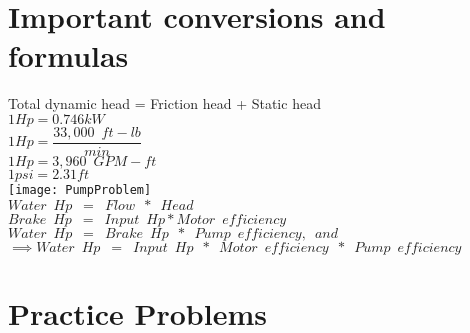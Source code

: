 \section{Important conversions and formulas}

Total dynamic head = Friction head + Static head\\
\vspace{0.3cm}
$1Hp=0.746kW$\\
\vspace{0.3cm}
$1Hp=\dfrac{33,000 \enspace ft-lb}{min}$\\
\vspace{0.3cm}
$1Hp=3,960 \enspace GPM-ft$\\
\vspace{0.3cm}
$1psi=2.31ft$\\
\vspace{0.3cm}
\texttt{[image: PumpProblem]}\\
\vspace{0.3cm}
$Water \enspace Hp \enspace = \enspace Flow \enspace *  \enspace Head$\\
\vspace{0.3cm}
$Brake  \enspace Hp \enspace = \enspace Input \enspace Hp*Motor \enspace efficiency$\\
\vspace{0.3cm}
$Water  \enspace Hp \enspace = \enspace Brake \enspace Hp \enspace * \enspace Pump  \enspace efficiency,  \enspace and$\\
\vspace{0.3cm}
$\implies Water  \enspace  Hp \enspace = \enspace Input  \enspace  Hp \enspace * \enspace Motor  \enspace efficiency \enspace * \enspace Pump  \enspace efficiency$\\

\newpage
\thispagestyle{empty}

\newpage

\thispagestyle{empty}

\newpage

\section{Practice Problems}


